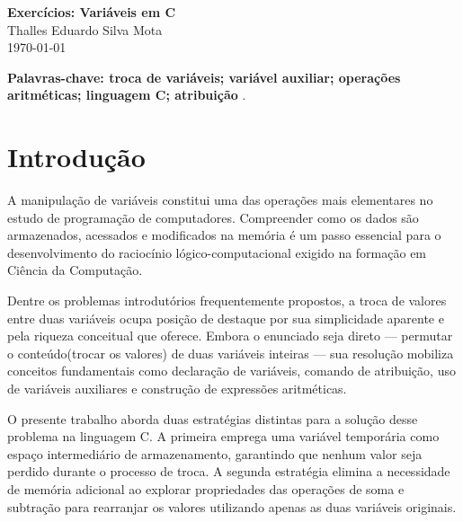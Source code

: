 \documentclass[12pt, a4paper]{article}
\newcommand{\NomeAluno}{Thalles Eduardo Silva Mota}             %
\begin{document}
\begin{center}
  {\Large\bfseries\color{ufmtAzul} Exercícios: Variáveis em C}\\[6pt]
  {\large \NomeAluno}\\[3pt]
  {\normalsize\color{ufmtCinza} \today}
\end{center}

\vspace{0.5cm}

\begin{abstract}
    \textbf{Este trabalho apresenta duas soluções para o problema clássico de troca de valores entre duas variáveis inteiras na linguagem C. A primeira abordagem utiliza uma variável auxiliar temporária para preservar um dos valores durante a permutação. A segunda abordagem realiza a troca exclusivamente por meio de operações aritméticas de soma e subtração, dispensando memória adicional. Ambas as implementações demonstram conceitos fundamentais de manipulação de variáveis, atribuição e expressões aritméticas em programação estruturada.}
\end{abstract}

\noindent\textbf{Palavras-chave: troca de variáveis; variável auxiliar; operações aritméticas; linguagem C; atribuição} .

\section*{Introdução}
  A manipulação de variáveis constitui uma das operações mais elementares no estudo de programação de computadores. Compreender como os dados são armazenados, acessados e modificados na memória é um passo essencial para o desenvolvimento do raciocínio lógico-computacional exigido na formação em Ciência da Computação.


Dentre os problemas introdutórios frequentemente propostos, a troca de valores entre duas variáveis ocupa posição de destaque por sua simplicidade aparente e pela riqueza conceitual que oferece. Embora o enunciado seja direto — permutar o conteúdo(trocar os valores) de duas variáveis inteiras — sua resolução mobiliza conceitos fundamentais como declaração de variáveis, comando de atribuição, uso de variáveis auxiliares e construção de expressões aritméticas.


O presente trabalho aborda duas estratégias distintas para a solução desse problema na linguagem C. A primeira emprega uma variável temporária como espaço intermediário de armazenamento, garantindo que nenhum valor seja perdido durante o processo de troca. A segunda estratégia elimina a necessidade de memória adicional ao explorar propriedades das operações de soma e subtração para rearranjar os valores utilizando apenas as duas variáveis originais.
\end{document}
